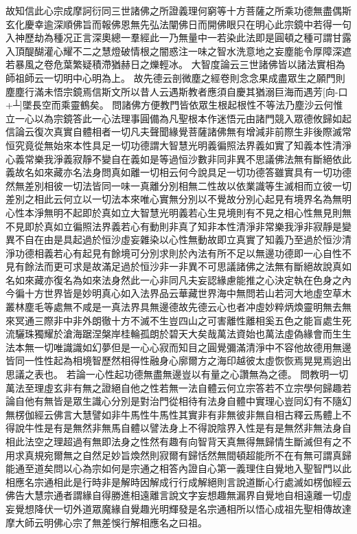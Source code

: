 故知信此心宗成摩訶衍同三世諸佛之所證義理何窮等十方菩薩之所乘功德無盡偶斯玄化慶幸逾深順佛旨而報佛恩無先弘法闡佛日而開佛眼只在明心此宗鏡中若得一句入神歷劫為種况正言深奧總一羣經此一乃無量中一若染此法即是圓頓之種可謂甘露入頂醍醐灌心耀不二之慧燈破情根之闇惑注一味之智水洗意地之妄塵能令厚障深遮若暴風之卷危葉繁疑積滯猶赫日之爍輕冰。
大智度論云三世諸佛皆以諸法實相為師祖師云一切明中心明為上。
故先德云剖微塵之經卷則念念果成盡眾生之願門則塵塵行滿未悟宗鏡焉信斯文所以昔人云遇斯教者應須自慶其猶溺巨海而遇芳[向-口+┴]墜長空而乘靈鶴矣。
問諸佛方便教門皆依眾生根起根性不等法乃塵沙云何惟立一心以為宗鏡答此一心法理事圓備為凡聖根本作迷悟元由諸門競入眾德攸歸如起信論云復次真實自體相者一切凡夫聲聞緣覺菩薩諸佛無有增減非前際生非後際滅常恒究竟從無始來本性具足一切功德謂大智慧光明義徧照法界義如實了知義本性清淨心義常樂我淨義寂靜不變自在義如是等過恒沙數非同非異不思議佛法無有斷絕依此義故名如來藏亦名法身問真如離一切相云何今說具足一切功德答雖實具有一切功德然無差別相彼一切法皆同一味一真離分別相無二性故以依業識等生滅相而立彼一切差別之相此云何立以一切法本來唯心實無分別以不覺故分別心起見有境界名為無明心性本淨無明不起即於真如立大智慧光明義若心生見境則有不見之相心性無見則無不見即於真如立徧照法界義若心有動則非真了知非本性清淨非常樂我淨非寂靜是變異不自在由是具起過於恒沙虛妄雜染以心性無動故即立真實了知義乃至過於恒沙清淨功德相義若心有起見有餘境可分別求則於內法有所不足以無邊功德即一心自性不見有餘法而更可求是故滿足過於恒沙非一非異不可思議諸佛之法無有斷絕故說真如名如來藏亦復名為如來法身然此一心非同凡夫妄認緣慮能推之心決定執在色身之內今徧十方世界皆是妙明真心如入法界品云華藏世界海中無問若山若河大地虛空草木叢林塵毛等處無不咸是一真法界具無邊德故先德云心也者冲虛妙粹炳煥靈明無去無來冥通三際非中非外朗徹十方不滅不生豈四山之可害離性離相奚五色之能盲處生死流驪珠獨耀於滄海踞涅槃岸桂輪孤朗於碧天大矣哉萬法資始也萬法虛偽緣會而生生法本無一切唯識識如幻夢但是一心心寂而知目之圓覺彌滿清淨中不容他故德用無邊皆同一性性起為相境智歷然相得性融身心廓爾方之海印越彼太虛恢恢焉晃晃焉逈出思議之表也。
若論一心性起功德無盡無邊豈以有量之心讚無為之德。
問教明一切萬法至理虛玄非有無之證絕自他之性若無一法自體云何立宗答若不立宗學何歸趣若論自他有無皆是眾生識心分別是對治門從相待有法身自體中實理心豈同幻有不隨幻無楞伽經云佛言大慧譬如非牛馬性牛馬性其實非有非無彼非無自相古釋云馬體上不得說牛性是有是無然非無馬自體以譬法身上不得說陰界入性是有是無然非無法身自相此法空之理超過有無即法身之性然有趣有向智背天真無得無歸情生斷滅但有之不用求真規宛爾無之自然足妙旨煥然則寂爾有歸恬然無間頓超能所不在有無可謂真歸能通至道矣問以心為宗如何是宗通之相答內證自心第一義理住自覺地入聖智門以此相應名宗通相此是行時非是解時因解成行行成解絕則言說道斷心行處滅如楞伽經云佛告大慧宗通者謂緣自得勝進相遠離言說文字妄想趣無漏界自覺地自相遠離一切虛妄覺想降伏一切外道眾魔緣自覺趣光明輝發是名宗通相所以悟心成祖先聖相傳故達摩大師云明佛心宗了無差悞行解相應名之曰祖。
